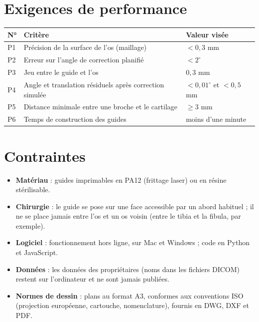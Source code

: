 \documentclass[11pt,a4paper]{article}
\begin{document}
\section{Exigences de performance}

\begin{tabularx}{\textwidth}{@{}lXl@{}}
\toprule
\textbf{N°} & \textbf{Critère} & \textbf{Valeur visée} \\ \midrule
P1 & Précision de la surface de l'os (maillage) & $< 0{,}3$ mm \\
P2 & Erreur sur l'angle de correction planifié & $< 2^\circ$ \\
P3 & Jeu entre le guide et l'os & $0{,}3$ mm \\
P4 & Angle et translation résiduels après correction simulée & $< 0{,}01^\circ$ et $< 0{,}5$ mm \\
P5 & Distance minimale entre une broche et le cartilage & $\geq 3$ mm \\
P6 & Temps de construction des guides & moins d'une minute \\
\bottomrule
\end{tabularx}

\section{Contraintes}

\begin{itemize}
  \item \textbf{Matériau} : guides imprimables en PA12 (frittage laser) ou en résine stérilisable.
  \item \textbf{Chirurgie} : le guide se pose sur une face accessible par un abord habituel ; il ne se place jamais
        entre l'os et un os voisin (entre le tibia et la fibula, par exemple).
  \item \textbf{Logiciel} : fonctionnement hors ligne, sur Mac et Windows ; code en Python et JavaScript.
  \item \textbf{Données} : les données des propriétaires (noms dans les fichiers DICOM) restent sur l'ordinateur et ne
        sont jamais publiées.
  \item \textbf{Normes de dessin} : plans au format A3, conformes aux conventions ISO (projection européenne,
        cartouche, nomenclature), fournis en DWG, DXF et PDF.
\end{itemize}
\end{document}
